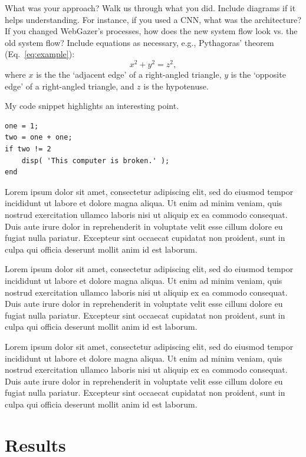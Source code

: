 \documentclass[10pt,twocolumn,letterpaper]{article}
\begin{document}
What was your approach? Walk us through what you did. Include diagrams if it helps understanding. For instance, if you used a CNN, what was the architecture? If you changed WebGazer's processes, how does the new system flow look vs. the old system flow? Include equations as necessary, e.g., Pythagoras' theorem (Eq.~\ref{eq:example}):
\begin{equation}
x^2 + y^2 = z^2,
\label{eq:example}
\end{equation}
where $x$ is the the `adjacent edge' of a right-angled triangle, $y$ is the `opposite edge' of a right-angled triangle, and $z$ is the hypotenuse.

My code snippet highlights an interesting point.
\begin{lstlisting}[style=Matlab-editor]
one = 1;
two = one + one;
if two != 2
    disp( 'This computer is broken.' );
end
\end{lstlisting}

Lorem ipsum dolor sit amet, consectetur adipiscing elit, sed do eiusmod tempor incididunt ut labore et dolore magna aliqua. Ut enim ad minim veniam, quis nostrud exercitation ullamco laboris nisi ut aliquip ex ea commodo consequat. Duis aute irure dolor in reprehenderit in voluptate velit esse cillum dolore eu fugiat nulla pariatur. Excepteur sint occaecat cupidatat non proident, sunt in culpa qui officia deserunt mollit anim id est laborum.

Lorem ipsum dolor sit amet, consectetur adipiscing elit, sed do eiusmod tempor incididunt ut labore et dolore magna aliqua. Ut enim ad minim veniam, quis nostrud exercitation ullamco laboris nisi ut aliquip ex ea commodo consequat. Duis aute irure dolor in reprehenderit in voluptate velit esse cillum dolore eu fugiat nulla pariatur. Excepteur sint occaecat cupidatat non proident, sunt in culpa qui officia deserunt mollit anim id est laborum.

Lorem ipsum dolor sit amet, consectetur adipiscing elit, sed do eiusmod tempor incididunt ut labore et dolore magna aliqua. Ut enim ad minim veniam, quis nostrud exercitation ullamco laboris nisi ut aliquip ex ea commodo consequat. Duis aute irure dolor in reprehenderit in voluptate velit esse cillum dolore eu fugiat nulla pariatur. Excepteur sint occaecat cupidatat non proident, sunt in culpa qui officia deserunt mollit anim id est laborum.

\section{Results}
\end{document}
